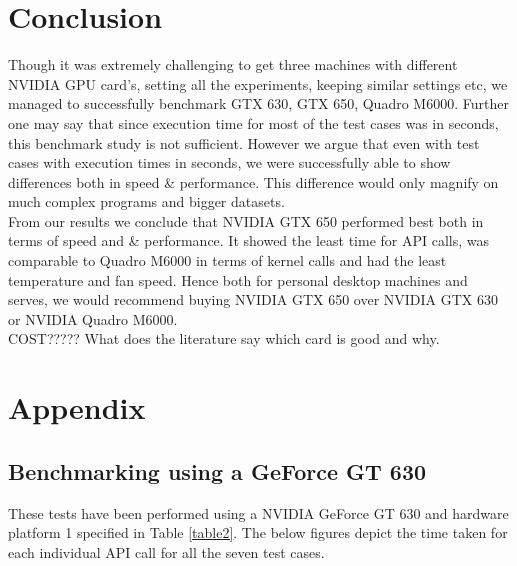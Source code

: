 \documentclass[paper=a4, fontsize=11pt]{scrartcl}
\numberwithin{equation}{section}		%
\numberwithin{figure}{section}			%
\numberwithin{table}{section}				%
\begin{document}
\newpage
\section{Conclusion}

Though it was extremely challenging to get three machines with different NVIDIA GPU card's, setting all the experiments, keeping similar settings etc, we managed to successfully benchmark GTX 630, GTX 650, Quadro M6000. Further one may say that since execution time for most of the test cases was in seconds, this benchmark study is not sufficient. However we argue that even with test cases with execution times in seconds, we were successfully able to show differences both in speed \& performance. This difference would only magnify on much complex programs and bigger datasets. \\

From our results we conclude that NVIDIA GTX 650 performed best both in terms of speed and \& performance. It showed the least time for API calls, was comparable to Quadro M6000 in terms of kernel calls and had the least temperature and fan speed. Hence both for personal desktop machines and serves, we would recommend buying NVIDIA GTX 650 over NVIDIA GTX 630 or NVIDIA Quadro M6000. \\

COST?????
What does the literature say which card is good and why.


\newpage
\section{Appendix}

\subsection{Benchmarking using a GeForce GT 630}
These tests have been performed using a NVIDIA GeForce GT 630 and hardware platform 1 specified in Table \ref{table2}. The below figures depict the time taken for each individual API call for all the seven test cases.
\end{document}
